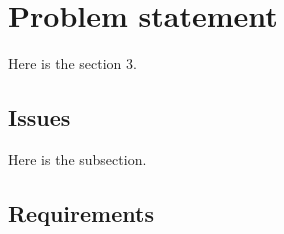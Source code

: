 \section{Problem statement}

Here is the section 3.

\subsection{Issues}

Here is the subsection.

\subsection{Requirements}